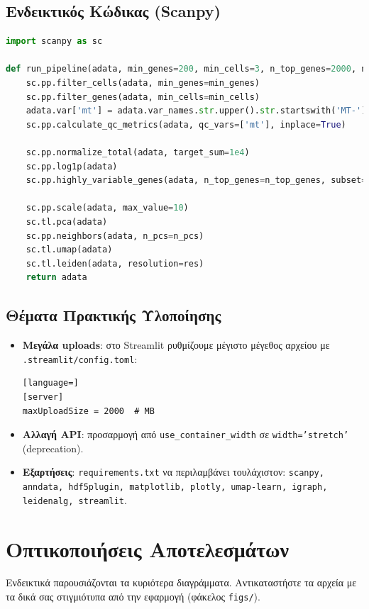 \documentclass[12pt,a4paper]{article}
\begin{document}
\subsection{Ενδεικτικός Κώδικας (Scanpy)}
\begin{lstlisting}[language=Python, caption={Ενδεικτική ακολουθία επεξεργασίας με Scanpy.}]
import scanpy as sc

def run_pipeline(adata, min_genes=200, min_cells=3, n_top_genes=2000, n_pcs=30, res=1.0):
    sc.pp.filter_cells(adata, min_genes=min_genes)
    sc.pp.filter_genes(adata, min_cells=min_cells)
    adata.var['mt'] = adata.var_names.str.upper().str.startswith('MT-')
    sc.pp.calculate_qc_metrics(adata, qc_vars=['mt'], inplace=True)

    sc.pp.normalize_total(adata, target_sum=1e4)
    sc.pp.log1p(adata)
    sc.pp.highly_variable_genes(adata, n_top_genes=n_top_genes, subset=True)

    sc.pp.scale(adata, max_value=10)
    sc.tl.pca(adata)
    sc.pp.neighbors(adata, n_pcs=n_pcs)
    sc.tl.umap(adata)
    sc.tl.leiden(adata, resolution=res)
    return adata
\end{lstlisting}

\subsection{Θέματα Πρακτικής Υλοποίησης}
\begin{itemize}
  \item \textbf{Μεγάλα uploads}: στο Streamlit ρυθμίζουμε μέγιστο μέγεθος αρχείου με \texttt{.streamlit/config.toml}:
\begin{lstlisting}[language=]
[server]
maxUploadSize = 2000  # MB
\end{lstlisting}
  \item \textbf{Αλλαγή API}: προσαρμογή από \texttt{use\_container\_width} σε \texttt{width='stretch'} (deprecation).
  \item \textbf{Εξαρτήσεις}: \texttt{requirements.txt} να περιλαμβάνει τουλάχιστον: \texttt{scanpy, anndata, hdf5plugin, matplotlib, plotly, umap-learn, igraph, leidenalg, streamlit}.
\end{itemize}

\section{Οπτικοποιήσεις Αποτελεσμάτων}
Ενδεικτικά παρουσιάζονται τα κυριότερα διαγράμματα. Αντικαταστήστε τα αρχεία με τα δικά σας στιγμιότυπα από την εφαρμογή (φάκελος \texttt{figs/}).
\end{document}
